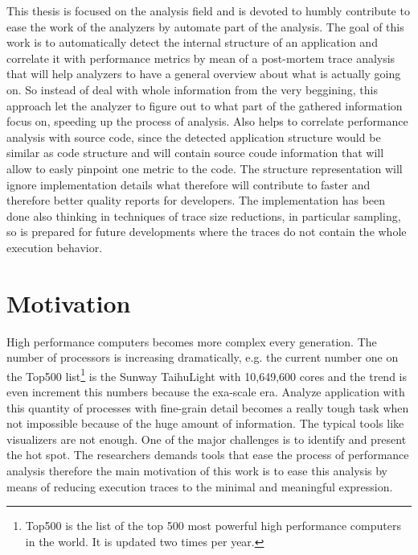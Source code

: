 \documentclass[12pt]{report}
\begin{document}
This thesis is focused on the analysis field and is devoted to humbly contribute 
to ease the work of the analyzers by
automate part of the analysis. The goal of this work is to automatically detect
the internal structure of an application and correlate it with performance metrics by
mean of a post-mortem trace analysis that will help analyzers to have a general
overview about what is actually going on. So instead of deal with whole
information from the very beggining, this approach let the analyzer to figure
out to what part of the gathered information focus on, speeding up the process of
analysis. Also helps to correlate performance analysis with source code, 
since the detected application structure would be similar as
code structure and will contain source coude information that will allow to
easly pinpoint one metric to the code. The structure representation will ignore 
implementation details what therefore will contribute to faster and therefore better 
quality reports for developers. The implementation has been done also thinking 
in techniques of trace size reductions, in particular sampling, so is prepared 
for future developments where the traces do not contain the whole execution behavior.

\section{Motivation}

High performance computers becomes more complex every generation. The number of 
processors is increasing dramatically, e.g. the current number one on the Top500
 list\footnote{Top500 is the list of the top 500 most powerful high performance 
computers in the world. It is updated two times per year.} is the Sunway TaihuLight 
with 10,649,600 cores\cite{top500_2017} and the trend is even increment this
numbers because the exa-scale era. Analyze application with this quantity 
of processes with fine-grain detail becomes a really tough task when not
impossible because of the huge amount of information. The typical tools like 
visualizers are not enough. One of the major challenges is to
identify and present the hot spot. The researchers demands tools that ease the 
process of performance analysis therefore the main motivation of this work is to ease 
this analysis by means of reducing execution traces to the minimal and meaningful 
expression.
\end{document}
